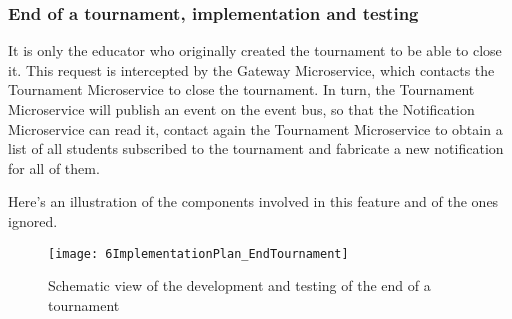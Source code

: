 \newpage
\subsubsection*{End of a tournament, implementation and testing}

It is only the educator who originally created the tournament to be able to close it. This request is intercepted by the Gateway Microservice, which contacts the Tournament Microservice to close the tournament. 
In turn, the Tournament Microservice will publish an event on the event bus, so that the Notification Microservice can read it, contact again the Tournament Microservice to obtain a list of all students subscribed to the tournament and fabricate a new notification for all of them.

Here's an illustration of the components involved in this feature and of the ones ignored.

\begin{figure}[h]
        \centering
	\texttt{[image: 6ImplementationPlan\_EndTournament]}
        \caption{Schematic view of the development and testing of the end of a tournament}
\end{figure}

\newpage

